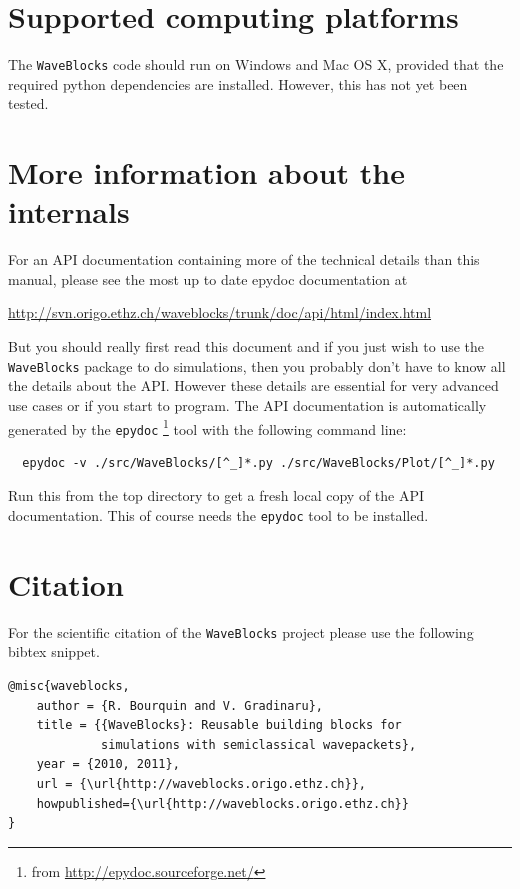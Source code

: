 \documentclass[a4paper,10pt]{report}
\begin{document}
\section{Supported computing platforms}

The \texttt{WaveBlocks} code should run on Windows and Mac OS X, provided
that the required python dependencies are installed. However, this has not yet been tested.

\section{More information about the internals}

For an API documentation containing more of the technical details than this
manual, please see the most up to date epydoc documentation at

\begin{center}
  \url{http://svn.origo.ethz.ch/waveblocks/trunk/doc/api/html/index.html}
\end{center}

But you should really first read this document and if you just wish to use the
\texttt{WaveBlocks} package to do simulations, then you probably don't
have to know all the details about the API. However these details are
essential for very advanced use cases or if you start to program. The
API documentation is automatically generated by the \texttt{epydoc}
\footnote{from \url{http://epydoc.sourceforge.net/}} tool with the following
command line:

\begin{verbatim}
  epydoc -v ./src/WaveBlocks/[^_]*.py ./src/WaveBlocks/Plot/[^_]*.py
\end{verbatim}

Run this from the top directory to get a fresh local copy of the API documentation.
This of course needs the \texttt{epydoc} tool to be installed.

\section{Citation}

For the scientific citation of the \texttt{WaveBlocks} project please
use the following bibtex snippet.

\begin{verbatim}
@misc{waveblocks,
    author = {R. Bourquin and V. Gradinaru},
    title = {{WaveBlocks}: Reusable building blocks for
             simulations with semiclassical wavepackets},
    year = {2010, 2011},
    url = {\url{http://waveblocks.origo.ethz.ch}},
    howpublished={\url{http://waveblocks.origo.ethz.ch}}
}
\end{verbatim}
\end{document}
